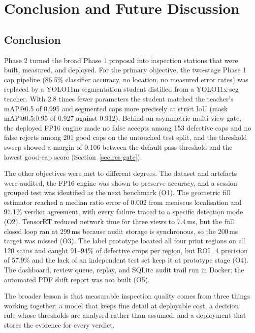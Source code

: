 \chapter{Conclusion and Future Discussion}
\label{ch:concl}

\section{Conclusion}
\label{sec:conclusion}

Phase 2 turned the broad Phase 1 proposal into inspection stations that were built, measured, and deployed. For the primary objective, the two-stage Phase 1 cap pipeline (86.5\% classifier accuracy, no location, no measured error rates) was replaced by a YOLO11m segmentation student distilled from a YOLO11x-seg teacher. With 2.8 times fewer parameters the student matched the teacher's mAP@0.5 of 0.995 and segmented caps more precisely at strict IoU (mask mAP@0.5:0.95 of 0.927 against 0.912). Behind an asymmetric multi-view gate, the deployed FP16 engine made no false accepts among 153 defective caps and no false rejects among 201 good caps on the untouched test split, and the threshold sweep showed a margin of 0.106 between the default pass threshold and the lowest good-cap score (Section~\ref{sec:res-gate}).

The other objectives were met to different degrees. The dataset and artefacts were audited, the FP16 engine was shown to preserve accuracy, and a session-grouped test was identified as the next benchmark (O1). The geometric fill estimator reached a median ratio error of 0.002 from meniscus localisation and 97.1\% verdict agreement, with every failure traced to a specific detection mode (O2). TensorRT reduced network time for three views to 7.4\,ms, but the full closed loop ran at 299\,ms because audit storage is synchronous, so the 200\,ms target was missed (O3). The label prototype located all four print regions on all 120 scans and caught 91--94\% of defective crops per region, but ROI\_4 precision of 57.9\% and the lack of an independent test set keep it at prototype stage (O4). The dashboard, review queue, replay, and SQLite audit trail run in Docker; the automated PDF shift report was not built (O5).

The broader lesson is that measurable inspection quality comes from three things working together: a model that keeps fine detail at deployable cost, a decision rule whose thresholds are analysed rather than assumed, and a deployment that stores the evidence for every verdict.

